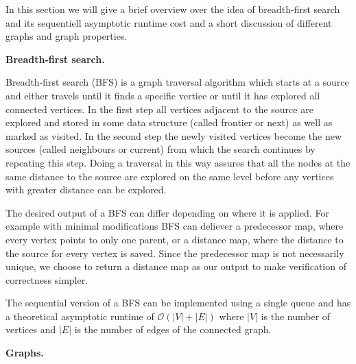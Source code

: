 \documentclass[letterpaper]{article}
\newcommand{\mypar}[1]{{\bf #1.}}
\begin{document}
In this section we will give a brief overview over the idea of breadth-first search and its sequentiell asymptotic runtime cost and a short discussion of different graphs and graph properties. 


\mypar{Breadth-first search}

Breadth-first search (BFS) is a graph traversal algorithm which starts at a source and either travels until it finds a specific vertice or until it has explored all connected vertices. In the first step all vertices adjacent to the source are explored and stored in some data structure (called frontier or next) as well as marked as visited. In the second step the newly visited vertices become the new sources (called neighbours or current) from which the search continues by repeating this step. Doing a traversal in this way assures that all the nodes at the same distance to the source are explored on the same level before any vertices with greater distance can be explored. 

The desired output of a BFS can differ depending on where it is applied. For example with minimal modifications BFS can deliever a predecessor map, where every vertex points to only one parent, or a distance map, where the distance to the source for every vertex is saved. Since the predecessor map is not necessarily unique, we choose to return a distance map as our output to make verification of correctness simpler.  

The sequential version of a BFS can be implemented using a single queue and has a theoretical asymptotic runtime of $\mathcal{O}(\left|V\right|+\left|E\right|)$ where $\left|V\right|$ is the number of vertices and $\left|E\right|$ is the number of edges of the connected graph.


\mypar{Graphs}



\end{document}
